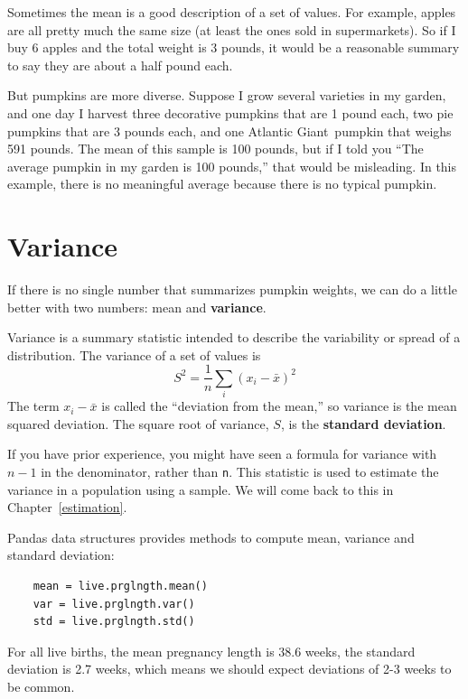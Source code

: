 \documentclass[12pt]{book}
\newcommand{\xbar}{\bar{x}}
\theoremstyle{exercise}
\begin{document}
Sometimes the mean is a good description of a set of values.  For
example, apples are all pretty much the same size (at least the ones
sold in supermarkets).  So if I buy 6 apples and the total weight is 3
pounds, it would be a reasonable summary to say they are about a half
pound each.%

But pumpkins are more diverse.  Suppose I grow several varieties in my
garden, and one day I harvest three decorative pumpkins that are 1
pound each, two pie pumpkins that are 3 pounds each, and one Atlantic
Giant\textregistered~pumpkin that weighs 591 pounds.  The mean of this
sample is 100 pounds, but if I told you ``The average pumpkin in my
garden is 100 pounds,'' that would be misleading.  In this example,
there is no meaningful average because there is no typical pumpkin.%



\section{Variance}%

If there is no single number that summarizes pumpkin weights,
we can do a little better with two numbers: mean and {\bf variance}.

Variance is a summary statistic intended to describe the variability
or spread of a distribution.  The variance of a set of values is
%
\[ S^2 = \frac{1}{n} \sum_i (x_i - \xbar)^2 \]
%
The term $x_i - \xbar$ is called the ``deviation from the mean,'' so
variance is the mean squared deviation.  The square root of variance,
$S$, is the {\bf standard deviation}.%
%
%

If you have prior experience, you might have seen a formula for
variance with $n-1$ in the denominator, rather than {\tt n}.  This
statistic is used to estimate the variance in a population using a
sample.  We will come back to this in Chapter~\ref{estimation}.%

Pandas data structures provides methods to compute mean, variance and
standard deviation:%

\begin{verbatim}
    mean = live.prglngth.mean()
    var = live.prglngth.var()
    std = live.prglngth.std()
\end{verbatim}

For all live births, the mean pregnancy length is 38.6 weeks, the
standard deviation is 2.7 weeks, which means we should expect
deviations of 2-3 weeks to be common.%
\end{document}
